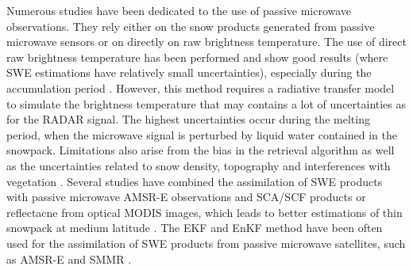 \documentclass[utf8]{frontiersSCNS} %
\begin{document}
Numerous studies have been dedicated to the use of passive microwave observations. They rely either on the snow products generated from passive microwave sensors or on directly on raw brightness temperature\citep{Chang_1982}. The use of direct raw brightness temperature has been performed and show good results (where SWE estimations have relatively small uncertainties), especially during the accumulation period \citep{Durand_2007,DeLannoy_2012,Liu_2013,Liu_2015}. However, this method requires a radiative transfer model to simulate the brightness temperature that may contains a lot of uncertainties as for the RADAR signal. The highest uncertainties occur during the melting period, when the microwave signal is perturbed by liquid water contained in the snowpack. Limitations also arise from the bias in the retrieval algorithm \citep{Andreadis_2006,Dong_2007,Kumar_2008} as well as the uncertainties related to snow density, topography and interferences with vegetation \citep{DeLannoy_2012}. Several studies have combined the assimilation of SWE products with passive microwave AMSR-E observations and SCA/SCF products or reflectacne from optical MODIS images, which leads to better estimations of thin snowpack at medium latitude \citep{Durand_2007,Kumar_2008,DeLannoy_2012,Liu_2013,Fletcher_2012}. The EKF and EnKF method have been often used for the assimilation of SWE products from passive microwave satellites, such as AMSR-E and SMMR \citep{Andreadis_2006,Kumar_2008,DeLannoy_2012,Liu_2013}.
\end{document}
